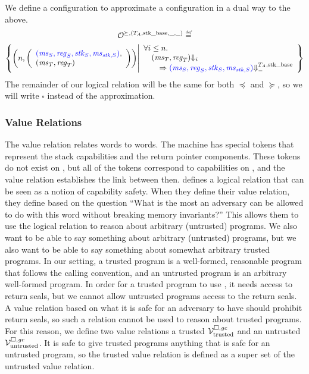 \begin{jversion}
We define a \trgcm{} configuration to approximate a \srccm{} configuration in a dual way to the above.
\begin{multline*}
  \lro[\succeq,(\ta,\stkb,\_,\_)] \defeq \\\left\{ \npair{\left(\array{l}\src{(\ms_S,\reg_S,\stk_S,\ms_{\stk,S})},\\(\ms_T,\reg_T)\endarray\right)} \middle|
    \begin{array}{l}
      \forall i \leq n \ldotp \\ 
      \quad (\ms_T ,\reg_T) \term[i] \\\qquad\Rightarrow \src{(\ms_S,\reg_S,\stk_S,\ms_{\stk,S})} \sterm{\ta,\stkb}
    \end{array}
\right\}
\end{multline*}
The remainder of our logical relation will be the same for both $\preceq$ and $\succeq$, so we will write $\square$ instead of the approximation.

\subsubsection{Value Relations}
The value relation relates \trgcm{} words to \srccm{} words.
The \srccm{} machine has special tokens that represent the stack capabilities and the return pointer components.
These tokens do not exist on \trgcm{}, but all of the tokens correspond to capabilities on \trgcm{}, and the value relation establishes the link between then.
\citet{skorstengaard_reasoning_2017} defines a logical relation that can be seen as a notion of capability safety.
When they define their value relation, they define based on the question ``What is the most an adversary can be allowed to do with this word without breaking memory invariants?''
This allows them to use the logical relation to reason about arbitrary (untrusted) programs.
We also want to be able to say something about arbitrary (untrusted) programs, but we also want to be able to say something about somewhat arbitrary trusted programs.
In our setting, a trusted program is a well-formed, reasonable program that follows the \stktokens{} calling convention, and an untrusted program is an arbitrary well-formed program.
In order for a trusted program to use \stktokens{}, it needs access to return seals, but we cannot allow untrusted programs access to the return seals.
A value relation based on what it is safe for an adversary to have should prohibit return seals, so such a relation cannot be used to reason about trusted programs.
For this reason, we define two value relations a trusted $\mathcal{V}^{\square,\mathit{gc}}_{\mathrm{trusted}}$ and an untrusted $\mathcal{V}^{\square,\mathit{gc}}_{\mathrm{untrusted}}$.
It is safe to give trusted programs anything that is safe for an untrusted program, so the trusted value relation is defined as a super set of the untrusted value relation.


\end{jversion}
